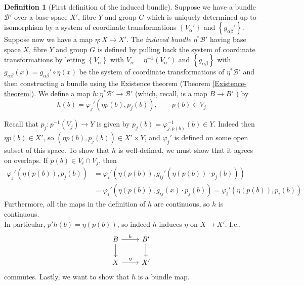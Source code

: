\documentclass[reqno]{amsart}
\theoremstyle{definition}
\newtheorem{definition}[theorem]{Definition}
\theoremstyle{remark}
\begin{document}
    \begin{definition}[First definition of the induced bundle]
        Suppose we have a bundle
        $\mathcal{B}'$ over a base
        space $X'$, fibre $Y$ and group $G$ which
        is uniquely determined up to isomorphism
        by a system of coordinate transformations
        $\left\{ V_{\alpha}' \right\} $ and
        $\left\{ g_{\alpha \beta}' \right\} $.
        Suppose now we have a map
        $\eta \colon X \to X'$.
        The \textit{induced bundle}
        $\eta^{*}\mathcal{B}'$ having base space
        $X$, fibre $Y$ and group $G$ is defined
        by pulling back the system of coordinate transformations
        by letting $\left\{ V_\alpha \right\} $ with
        $V_{\alpha} = \eta^{-1}\left( V_{\alpha}' \right) $ 
        and
        $\left\{ g_{\alpha \beta} \right\} $ with
        $g_{\alpha \beta}(x)
        = g_{\alpha \beta}' \circ \eta(x)$ be the
        system of coordinate transformations of
        $\eta^{*}\mathcal{B}'$ and then constructing a
        bundle using the Existence theorem
        (Theorem \ref{Existence-theorem}).
        We define a map
        $h \colon
        \eta^{*}\mathcal{B}' \to \mathcal{B}'$ (which,
        recall, is a map $B \to B'$ ) by
        \[
            h(b) =
        \varphi_j' \left( 
        \eta p(b), p_j(b) \right) , \qquad
    p(b) \in V_j
\]

        Recall that
        $p_j \colon
        p^{-1}(V_j) \to Y$ is given by
        $p_j(b) = \varphi_{j,p(b)}^{-1}(b) \in Y$.
        Indeed then
        $\eta p(b) \in X'$, so
        $\left( \eta p(b), p_j(b) \right) \in 
        X' \times Y$, and 
        $\varphi_j'$ is defined on some open
        subset of this space.
        To show that $h$ is well-defined, we
        must show that it agrees on overlaps.
        If $p(b) \in V_i \cap V_j$, then
        \begin{align*}
        \varphi_j'\left( \eta(p(b)), p_j(b) \right) 
        &= \varphi_i' \left( \eta(p(b)),
        g_{ij}' \left( \eta\left( p(b) \right)
    \cdot p_j(b) \right) \right) \\
        &= \varphi_i' \left( \eta (p(b)),
        g_{ij}(x) \cdot p_j(b) \right) 
        = \varphi_i' \left( \eta (p(b)),
        p_i(b) \right) 
        \end{align*}
        Furthermore, all the maps in the definition
        of $h$ are continuous, so $h$ is continuous.\\

        In particular,
        $p' h(b) = \eta(p(b))$, so
        indeed $h$ induces $\eta$ on $X \to X'$. I.e.,
        \begin{equation*}
        \begin{tikzcd}
            B \ar[r, "h"] \ar[d] & B'\ar[d] \\
            X \ar[r, "\eta"] & X'
        \end{tikzcd}
        \end{equation*}
        commutes.
        Lastly, we want to show that $h$ is a bundle map.


\end{definition}
\end{document}
